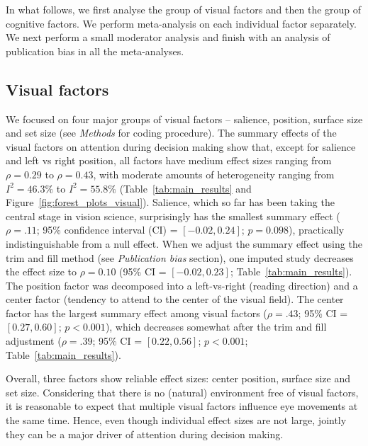 \documentclass[english,natbib,man,floatsintext]{apa6}
\begin{document}
In what follows, we first analyse the group of visual factors and then the group of cognitive factors. We perform meta-analysis on each individual factor  separately. We next perform a small moderator analysis and finish with an analysis of publication bias in all the meta-analyses.  


\subsection{Visual factors}

We focused on four major groups of visual factors -- salience, position, surface size and set size (see \textit{Methods} for coding procedure). The summary effects of the visual factors on attention during decision making show that, except for salience and left vs right position, all factors have medium effect sizes ranging from $\rho = 0.29$ to $\rho = 0.43$, with moderate amounts of heterogeneity ranging from $I^2 = 46.3\%$ to $I^2 = 55.8\%$ (Table~\ref{tab:main_results} and Figure~\ref{fig:forest_plots_visual}). Salience, which so far has been taking the central stage in vision science, surprisingly has the smallest summary effect ($\rho = .11$; 95\% confidence interval (CI) = $[-0.02,0.24]$; $p=0.098$), practically indistinguishable from a null effect. When we adjust the summary effect using the trim and fill method (see \textit{Publication bias} section), one imputed study decreases the effect size to $\rho = 0.10$ (95\% CI = $[-0.02,0.23]$; Table~\ref{tab:main_results}). The position factor was decomposed into a left-vs-right (reading direction) and a center factor (tendency to attend to the center of the visual field). The center factor has the largest summary effect among visual factors ($\rho = .43$; 95\% CI = $[0.27,0.60]$; $p<0.001$), which decreases somewhat after the trim and fill adjustment ($\rho = .39$; 95\% CI = $[0.22,0.56]$; $p<0.001$; Table~\ref{tab:main_results}). 

Overall, three factors show reliable effect sizes: center position, surface size and set size. Considering that there is no (natural) environment free of visual factors, it is reasonable to expect that multiple visual factors influence eye movements at the same time. Hence, even though individual effect sizes are not large, jointly they can be a major driver of attention during decision making.



\end{document}
